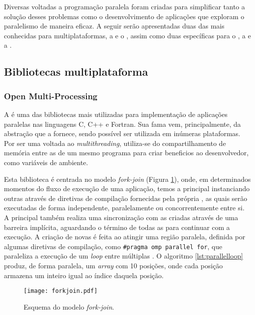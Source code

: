 Diversas \APIs voltadas a programação paralela foram criadas para simplificar tanto a solução desses problemas como o desenvolvimento de aplicações que exploram o paralelismo de maneira eficaz. A seguir serão apresentadas duas das mais conhecidas \APIs para multiplataformas, a \textit{\OpenMP} e o \textit{\MPI}, assim como duas \APIs específicas para o \mppa, a \ASYNC e a \IPC.

\subsection{Bibliotecas multiplataforma}
\label{sec:bibliotecasmultiplataforma}

\subsubsection{Open Multi-Processing}
\label{sec:openmp}

A \OpenMP é uma das bibliotecas mais utilizadas para implementação de aplicações paralelas nas linguagens C, C++ e Fortran. Sua fama vem, principalmente, da abstração que a \API fornece, sendo possível ser utilizada em inúmeras plataformas. Por ser uma \API voltada ao \textit{multithreading}, utiliza-se do compartilhamento de memória entre as \threads de um mesmo programa para criar beneficios ao desenvolvedor, como variáveis de ambiente.

Esta biblioteca é centrada no modelo \textit{fork-join} (Figura \ref{fig:forkjoin}), onde, em determinados momentos do fluxo de execução de uma aplicação, temos a \thread principal instanciando outras \threads através de diretivas de compilação fornecidas pela própria \API, as quais serão executadas de forma independente, paralelamente ou concorrentemente entre si. A \thread principal também realiza uma sincronização com as \threads criadas através de uma barreira implícita, aguardando o término de todas as \threads para continuar com a execução. A criação de novas \threads é feita ao atingir uma região paralela, definida por algumas diretivas de compilação, como \texttt{\#pragma omp parallel for}, que paraleliza a execução de um \textit{loop} entre múltiplas \threads. O algoritmo \ref{lst:parallelloop} produz, de forma paralela, um \textit{array} com 10 posições, onde cada posição armazena um inteiro igual ao índice daquela posição.


\begin{figure}[tb]
  \centering
  \caption{Esquema do modelo \textit{fork-join}.}
  \label{fig:forkjoin}
  \texttt{[image: forkjoin.pdf]}
\end{figure}

